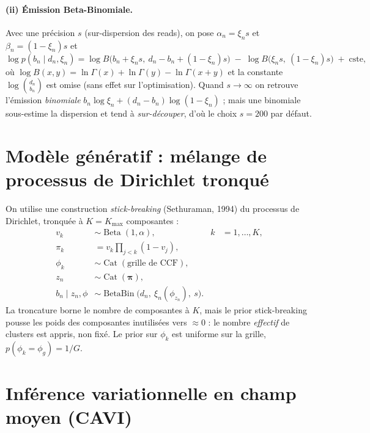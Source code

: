 \documentclass[11pt,a4paper]{article}
\DeclareMathOperator{\BetaBin}{BetaBin}
\DeclareMathOperator{\Cat}{Cat}
\DeclareMathOperator{\Bdist}{Beta}
\theoremstyle{remark}
\begin{document}
\paragraph{(ii) Émission Beta-Binomiale.} Avec une précision $s$ (sur-dispersion des reads),
on pose $\alpha_n=\xi_n s$ et $\beta_n=(1-\xi_n)s$ et
\begin{equation}\label{eq:bbll}
\log p(b_n\mid d_n,\xi_n)
= \log B\!\big(b_n+\xi_n s,\ d_n-b_n+(1-\xi_n)s\big)\;-\;\log B\!\big(\xi_n s,\ (1-\xi_n)s\big)
\;+\;\text{cste},
\end{equation}
où $\log B(x,y)=\ln\Gamma(x)+\ln\Gamma(y)-\ln\Gamma(x+y)$ et la constante
$\log\binom{d_n}{b_n}$ est omise (sans effet sur l'optimisation). Quand $s\to\infty$ on
retrouve l'émission \emph{binomiale} $b_n\log\xi_n+(d_n-b_n)\log(1-\xi_n)$ ; mais une
binomiale sous-estime la dispersion et tend à \emph{sur-découper}, d'où le choix $s=200$ par
défaut.

\section{Modèle génératif : mélange de processus de Dirichlet tronqué}

On utilise une construction \emph{stick-breaking} (Sethuraman, 1994) du processus de
Dirichlet, tronquée à $K=K_{\max}$ composantes :
\begin{align}
v_k &\sim \Bdist(1,\alpha), & k&=1,\dots,K, \label{eq:stick}\\
\pi_k &= v_k \prod_{j<k}(1-v_j), \\
\phi_k &\sim \Cat(\text{grille de CCF}), \\
z_n &\sim \Cat(\bm\pi), \\
b_n \mid z_n,\phi &\sim \BetaBin\!\big(d_n,\ \xi_n(\phi_{z_n}),\ s\big).
\end{align}
La troncature borne le nombre de composantes à $K$, mais le prior stick-breaking pousse les
poids des composantes inutilisées vers $\approx 0$ : le nombre \emph{effectif} de clusters
est appris, non fixé. Le prior sur $\phi_k$ est uniforme sur la grille,
$p(\phi_k=\phi_g)=1/G$.

\section{Inférence variationnelle en champ moyen (CAVI)}
\end{document}
